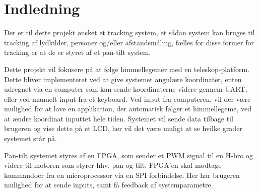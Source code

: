 \section{Indledning}
Der er til dette projekt ønsket et tracking system, et sådan system kan bruges til tracking af lydkilder, personer og/eller afstandsmåling, fælles for disse former for tracking er at de er styret af et pan-tilt system.

Dette projekt vil fokusere på at følge himmellegemer med en teleskop-platform. Dette bliver implementeret ved at give systemet angulære koordinater, enten udregnet via en computer som kan sende koordinaterne videre gennem UART, eller ved manuelt input fra et keyboard. Ved input fra computeren, vil der være mulighed for at lave en applikation, der automatisk følger et himmellegeme, ved at ændre koordinat inputtet hele tiden.
Systemet vil sende data tilbage til brugeren og vise dette på et LCD, her vil det være muligt at se hvilke grader systemet står på.

Pan-tilt systemet styres af en FPGA, som sender et PWM signal til en H-bro og videre til motoren som styrer hhv. pan og tilt.
FPGA’en skal modtage kommandoer fra en microprocessor via en SPI forbindelse.
Her har brugeren mulighed for at sende inputs, samt få feedback af systemparametre.